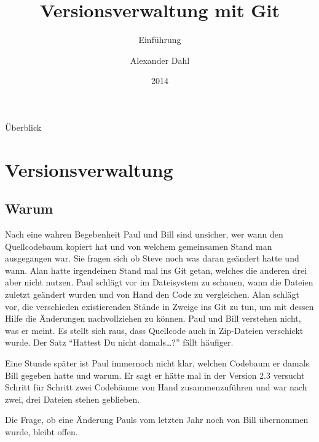 \documentclass{beamer}
\title{Versionsverwaltung mit Git}
\subtitle{Einführung}
\author{Alexander Dahl}
\institute{Netz39 e.\,V.}
\date{2014}
\begin{document}
\begin{frame}
	\titlepage
\end{frame}

\logo{
    
}

\begin{frame}{Überblick}
    \tableofcontents
\end{frame}

\section{Versionsverwaltung}

\subsection{Warum}


\begin{frame}{Nach eine wahren Begebenheit}
    Paul und Bill sind unsicher, wer wann den Quellcodebaum kopiert hat
    und von welchem gemeinsamen Stand man ausgegangen war. Sie fragen
    sich ob Steve noch was daran geändert hatte und wann. Alan hatte
    irgendeinen Stand mal ins Git getan, welches die anderen drei aber
    nicht nutzen. Paul schlägt vor im Dateisystem zu schauen, wann die
    Dateien zuletzt geändert wurden und von Hand den Code zu
    vergleichen. Alan schlägt vor, die verschieden existierenden Stände
    in Zweige ins Git zu tun, um mit dessen Hilfe die Änderungen
    nachvollziehen zu können. Paul und Bill verstehen nicht, was er
    meint. Es stellt sich raus, dass Quellcode auch in Zip-Dateien
    verschickt wurde. Der Satz \enquote{Hattest Du nicht damals…?} fällt
    häufiger.

    Eine Stunde später ist Paul immernoch nicht klar, welchen Codebaum
    er damals Bill gegeben hatte und warum. Er sagt er hätte mal in der
    Version 2.3 versucht Schritt für Schritt zwei Codebäume von Hand
    zusammenzuführen und war nach zwei, drei Dateien stehen geblieben.

    Die Frage, ob eine Änderung Pauls vom letzten Jahr noch von Bill
    übernommen wurde, bleibt offen.
\end{frame}
\end{document}
